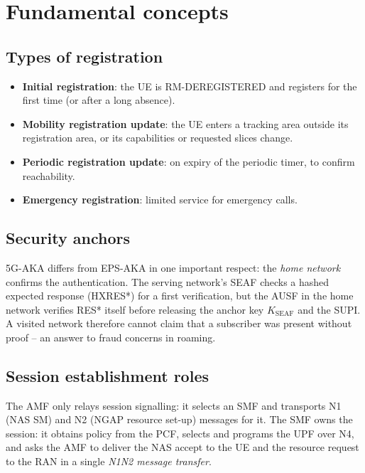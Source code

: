 \documentclass[11pt,a4paper]{article}
\begin{document}
\section{Fundamental concepts}

\subsection{Types of registration}
\begin{itemize}
  \item \textbf{Initial registration}: the UE is RM-DEREGISTERED and registers for the first time (or after a long absence).
  \item \textbf{Mobility registration update}: the UE enters a tracking area outside its registration area, or its capabilities or
        requested slices change.
  \item \textbf{Periodic registration update}: on expiry of the periodic timer, to confirm reachability.
  \item \textbf{Emergency registration}: limited service for emergency calls.
\end{itemize}

\subsection{Security anchors}
5G-AKA \cite{ts33501} differs from EPS-AKA in one important respect: the \emph{home network} confirms the authentication. The serving
network's SEAF checks a hashed expected response (HXRES*) for a first verification, but the AUSF in the home network verifies RES*
itself before releasing the anchor key $K_{\mathrm{SEAF}}$ and the SUPI. A visited network therefore cannot claim that a subscriber was
present without proof -- an answer to fraud concerns in roaming.

\subsection{Session establishment roles}
The AMF only relays session signalling: it selects an SMF and transports N1 (NAS SM) and N2 (NGAP resource set-up) messages for it. The
SMF owns the session: it obtains policy from the PCF, selects and programs the UPF over N4, and asks the AMF to deliver the NAS accept to
the UE and the resource request to the RAN in a single \emph{N1N2 message transfer}.

\end{document}
